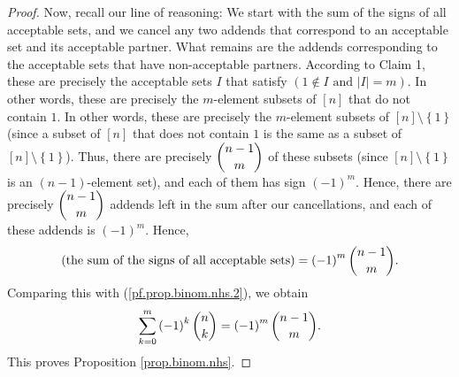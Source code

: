 \begin{proof}
Now, recall our line of reasoning: We start with the sum of the signs of all
acceptable sets, and we cancel any two addends that correspond to an
acceptable set and its acceptable partner. What remains are the addends
corresponding to the acceptable sets that have non-acceptable partners.
According to Claim 1, these are precisely the acceptable sets $I$ that satisfy
$\left(  1\notin I\text{ and }\left\vert I\right\vert =m\right)  $. In other
words, these are precisely the $m$-element subsets of $\left[  n\right]  $
that do not contain $1$. In other words, these are precisely the $m$-element
subsets of $\left[  n\right]  \setminus\left\{  1\right\}  $ (since a subset
of $\left[  n\right]  $ that does not contain $1$ is the same as a subset of
$\left[  n\right]  \setminus\left\{  1\right\}  $). Thus, there are precisely
$\dbinom{n-1}{m}$ of these subsets (since $\left[  n\right]  \setminus\left\{
1\right\}  $ is an $\left(  n-1\right)  $-element set), and each of them has
sign $\left(  -1\right)  ^{m}$. Hence, there are precisely $\dbinom{n-1}{m}$
addends left in the sum after our cancellations, and each of these addends is
$\left(  -1\right)  ^{m}$. Hence,
\[
\left(  \text{the sum of the signs of all acceptable sets}\right)  =\left(
-1\right)  ^{m}\dbinom{n-1}{m}.
\]
Comparing this with (\ref{pf.prop.binom.nhs.2}), we obtain
\[
\sum_{k=0}^{m}\left(  -1\right)  ^{k}\dbinom{n}{k}=\left(  -1\right)
^{m}\dbinom{n-1}{m}.
\]
This proves Proposition \ref{prop.binom.nhs}.
\end{proof}

